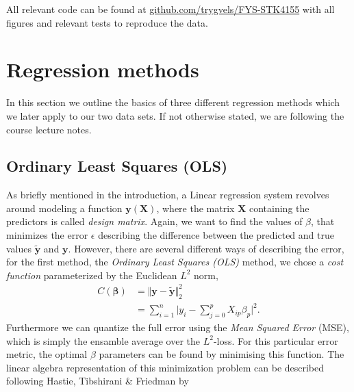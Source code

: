 \documentclass[a4paper, twocolumn]{article}
\begin{document}
All relevant code can be found at \href{https://github.com/trygvels/FYS-STK4155}{github.com/trygvels/FYS-STK4155} with all figures and relevant tests to reproduce the data. 

\section{Regression methods}
In this section we outline the basics of three different regression methods which we later apply to our two data sets. If not otherwise stated, we are following the course lecture notes\autocite{MHJ}. 
\subsection{Ordinary Least Squares (OLS)}
As briefly mentioned in the introduction, a Linear regression system revolves around modeling a function $\mathbf{y}(\mathbf{X})$, where the matrix $\mathbf{X}$ containing the predictors is called \textit{design matrix}. Again, we want to find the values of $\beta$, that minimizes the error $\epsilon$ describing the difference between the predicted and true values $\mathbf{\tilde{y}}$ and $\mathbf{y}$.
However, there are several different ways of describing the error, for the first method, the \textit{Ordinary Least Squares (OLS)} method, we chose a \textit{cost function} parameterized by the Euclidean $L^2$ norm,
\begin{align}
C(\bm\beta) &= \Vert \mathbf{y} - \tilde{\mathbf{y}}\Vert_2^2 \nonumber \\
&= \sum_{i=1}^n \Big| y_i - \sum_{j=0}^p X_{ip} \beta_p \Big|^2. \label{eq:cost}
\end{align}
Furthermore we can quantize the full error using the \textit{Mean Squared Error} (MSE), which is simply the ensamble average over the $L^2$-loss. 
For this particular error metric, the optimal $\beta$ parameters can be found by minimising this function.
The linear algebra representation of this minimization problem can be described following Hastie, Tibshirani \& Friedman\autocite{trevor2009elements} by
\end{document}
